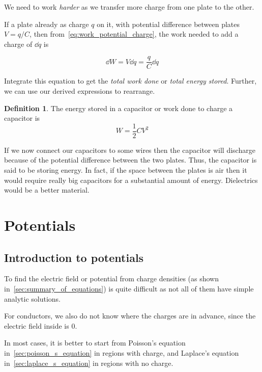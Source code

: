 \documentclass[12pt,chapterprefix=false,dvipsnames]{scrbook}
\theoremstyle{dotless}
\theoremstyle{definition}
\newtheorem{protodefinition}{Definition}[section]
\newenvironment{definition}
{\colorlet{shadecolor}{black!15}\begin{shaded}\begin{protodefinition}}
			{\end{protodefinition}\end{shaded}}
\begin{document}
We need to work \textit{harder} as we transfer more
charge from one plate to the other.

If a plate already as charge $q$ on it, with
potential difference between plates $V = q/C$,
then from~\ref{eq:work_potential_charge}, the work needed to add a
charge of $\dd{q}$ is

\begin{equation}
	\dd{W} = V \dd{q} =
	\frac{q}{C}\dd{q}
\end{equation}

Integrate this equation to get the \textit{total work done} or
\textit{total energy stored}. Further, we can use our derived
expressions to rearrange.

\begin{definition}
	The energy stored in a capacitor or work done to charge a
	capacitor is
	\begin{equation}
		\label{eq:energy_in_capacitor} W =
		\frac{1}{2} CV^2
	\end{equation}
\end{definition}

If we now connect our capacitors to some wires then the
capacitor will discharge because of the potential difference
between the two plates. Thus, the capacitor is said to be
storing energy. In fact, if the space between the plates is air
then it would require really big capacitors for a substantial
amount of energy. Dielectrics would be a better material.

\chapter{Potentials}%
\label{cha:potentials}

\section{Introduction to potentials}%
\label{sec:introduction_to_potentials}

To find the electric field or potential from charge densities
(as shown in~\ref{sec:summary_of_equations}) is quite difficult as not
all of them have simple analytic solutions.

For conductors, we also do not know where the charges are in
advance, since the electric field inside is 0.

In most cases, it is better to start from Poisson's equation
in~\ref{sec:poisson_s_equation} in regions with charge, and
Laplace's equation in~\ref{sec:laplace_s_equation} in regions with
no charge.
\end{document}
